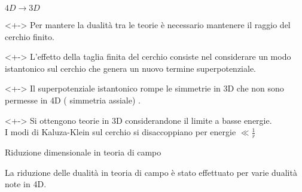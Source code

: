 \documentclass[10pt,compress]{beamer}
\begin{document}
\begin{frame}{$4D \rightarrow 3D$ }
\begin{block}{}<+->
Per mantere la dualità tra le teorie è necessario mantenere il raggio del cerchio finito.\\
\end{block}
\begin{block}{}<+->
L'effetto della taglia finita del cerchio consiste nel considerare un modo istantonico sul cerchio che genera un nuovo termine superpotenziale.
\end{block}
\begin{block}{}<+->
Il superpotenziale istantonico rompe le simmetrie in 3D che non sono permesse in 4D ( simmetria assiale) . 
\end{block}

\begin{block}{}<+->
Si ottengono teorie in 3D considerandone il limite a basse energie.\\
I modi di Kaluza-Klein sul cerchio si disaccoppiano per energie $\ll \frac{1}{r}$
\end{block}

\end{frame}

\begin{frame}{Riduzione dimensionale in teoria di campo}
\begin{block}{}
La riduzione delle dualità in teoria di campo è stato effettuato per varie dualità note in 4D.\\

\end{block}

\end{frame}







\nocite{*}


\end{document}
